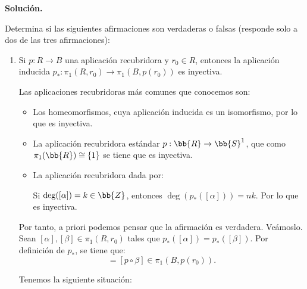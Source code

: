 \documentclass[12pt]{article}
\begin{document}
    \newpage
    \setcounter{ejercicio}{0} %
    \noindent
    \textbf{Solución.}

    \begin{ejercicio}[5 puntos]
        Determina si las siguientes afirmaciones son verdaderas o falsas (responde solo a dos de las tres afirmaciones):
        \begin{enumerate}
            \item Si $p: R \to B$ una aplicación recubridora y $r_0 \in R$, entonces la aplicación inducida $p_*: \pi_1(R, r_0) \to \pi_1(B, p(r_0))$ es inyectiva.
            
            Las aplicaciones recubridoras más comunes que conocemos son:
            \begin{itemize}
                \item Los homeomorfismos, cuya aplicación inducida es un isomorfismo, por lo que es inyectiva.
                \item La aplicación recubridora estándar $p: \bb{R} \to \bb{S}^1$, que como $\pi_1(\bb{R}) \cong \{1\}$ se tiene que es inyectiva.
                \item La aplicación recubridora dada por:
                
                Si $\deg([\alpha]) = k\in \bb{Z}$, entonces $\deg(p_*([\alpha])) = nk$. Por lo que es inyectiva.
            \end{itemize}

            Por tanto, a priori podemos pensar que la afirmación es verdadera. Veámoslo.\\
            
            Sean $[\alpha], [\beta] \in \pi_1(R, r_0)$ tales que $p_*([\alpha]) = p_*([\beta])$. Por definición de $p_*$, se tiene que:
            \begin{equation*}
                [p \circ \alpha] = [p \circ \beta]\in \pi_1(B, p(r_0)).
            \end{equation*}

            Tenemos la siguiente situación:
            \begin{center}
            \end{center}


\end{enumerate}
\end{ejercicio}
\end{document}
